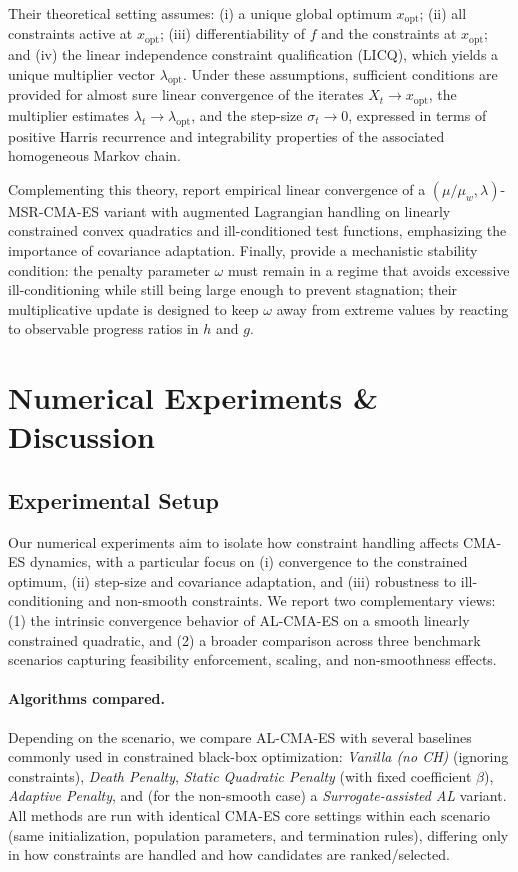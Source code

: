 \documentclass[11pt,a4paper]{article}
\numberwithin{equation}{section}
\numberwithin{figure}{section}
\numberwithin{table}{section}
\theoremstyle{definition}
\begin{document}
Their theoretical setting assumes:
(i) a unique global optimum $x_{\mathrm{opt}}$;
(ii) all constraints active at $x_{\mathrm{opt}}$;
(iii) differentiability of $f$ and the constraints at $x_{\mathrm{opt}}$;
and (iv) the linear independence constraint qualification (LICQ),
which yields a unique multiplier vector $\lambda_{\mathrm{opt}}$.
Under these assumptions, sufficient conditions are provided for almost sure linear convergence of
the iterates $X_t\to x_{\mathrm{opt}}$,
the multiplier estimates $\lambda_t\to \lambda_{\mathrm{opt}}$,
and the step-size $\sigma_t\to 0$,
expressed in terms of positive Harris recurrence and integrability properties
of the associated homogeneous Markov chain.

Complementing this theory,
\cite{Atamna2016} report empirical linear convergence of a
$(\mu/\mu_w,\lambda)$-MSR-CMA-ES variant with augmented Lagrangian handling
on linearly constrained convex quadratics and ill-conditioned test functions,
emphasizing the importance of covariance adaptation.
Finally, \cite{ArnoldPorter2015} provide a mechanistic stability condition:
the penalty parameter $\omega$ must remain in a regime that avoids excessive ill-conditioning
while still being large enough to prevent stagnation;
their multiplicative update is designed to keep $\omega$ away from extreme values
by reacting to observable progress ratios in $h$ and $g$.


\section{Numerical Experiments \& Discussion}

\subsection{Experimental Setup}\label{subsec:exp-setup}
Our numerical experiments aim to isolate how constraint handling affects CMA-ES dynamics,
with a particular focus on (i) convergence to the constrained optimum, (ii) step-size and
covariance adaptation, and (iii) robustness to ill-conditioning and non-smooth constraints.
We report two complementary views:
(1) the intrinsic convergence behavior of AL-CMA-ES on a smooth linearly constrained quadratic,
and (2) a broader comparison across three benchmark scenarios capturing feasibility enforcement,
scaling, and non-smoothness effects.

\paragraph{Algorithms compared.}
Depending on the scenario, we compare AL-CMA-ES with several baselines commonly used in
constrained black-box optimization:
\emph{Vanilla (no CH)} (ignoring constraints), \emph{Death Penalty},
\emph{Static Quadratic Penalty} (with fixed coefficient $\beta$),
\emph{Adaptive Penalty}, and (for the non-smooth case) a \emph{Surrogate-assisted AL} variant.
All methods are run with identical CMA-ES core settings within each scenario
(same initialization, population parameters, and termination rules), differing only in how
constraints are handled and how candidates are ranked/selected.
\end{document}
